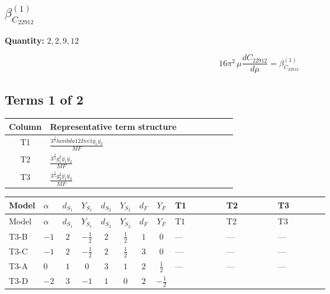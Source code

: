 \documentclass[8pt]{article}
\begin{document}
\begin{landscape}
\section*{$\beta_{C_{22912}}^{(1)}$}
\noindent\textbf{Quantity: }$\mathrm{2,2,9,12}$\par\smallskip
\[16\pi^2\,\mu\frac{d C_{22912}}{d\mu}=\beta_{C_{22912}}^{(1)}\]
\subsection*{Terms 1 of 2}
\begin{center}
\begin{tabular}{@{}c >{\raggedright\arraybackslash}p{0.82\linewidth}@{}}
\toprule
Column & Representative term structure \\
\midrule
T1 & \(\displaystyle \frac{3^{\frac{3}{4}} lambda12Inv1 \overline{y_{1}} \overline{y_{2}}}{MF}\) \\
\midrule
T2 & \(\displaystyle \frac{3^{\frac{3}{4}} g_{1}^{2} \overline{y_{1}} \overline{y_{2}}}{MF}\) \\
\midrule
T3 & \(\displaystyle \frac{3^{\frac{3}{4}} g_{2}^{2} \overline{y_{1}} \overline{y_{2}}}{MF}\) \\
\midrule
\bottomrule
\end{tabular}
\end{center}
\smallskip
\tiny
\begin{longtable}{@{}llcccccc >{\raggedright\arraybackslash}p{0.21\linewidth} >{\raggedright\arraybackslash}p{0.21\linewidth} >{\raggedright\arraybackslash}p{0.21\linewidth}@{}}
\toprule
Model & $\alpha$ & $d_{S_1}$ & $Y_{S_1}$ & $d_{S_2}$ & $Y_{S_2}$ & $d_F$ & $Y_F$ & T1 & T2 & T3 \\
\midrule
\endfirsthead
\toprule
Model & $\alpha$ & $d_{S_1}$ & $Y_{S_1}$ & $d_{S_2}$ & $Y_{S_2}$ & $d_F$ & $Y_F$ & T1 & T2 & T3 \\
\midrule
\endhead
T3-B & $-1$ & $2$ & $-\frac{1}{2}$ & $2$ & $\frac{1}{2}$ & $1$ & $0$ & --- & --- & --- \\
\midrule
T3-C & $-1$ & $2$ & $-\frac{1}{2}$ & $2$ & $\frac{1}{2}$ & $3$ & $0$ & --- & --- & --- \\
\midrule
T3-A & $0$ & $1$ & $0$ & $3$ & $1$ & $2$ & $\frac{1}{2}$ & --- & --- & --- \\
\midrule
T3-D & $-2$ & $3$ & $-1$ & $1$ & $0$ & $2$ & $-\frac{1}{2}$ & \scriptsize\adjustbox{max width=\linewidth}{$\begin{gathered} \frac{3^{\frac{3}{4}} lambda12Inv1 \overline{y_{1}} \overline{y_{2}}}{6 MF}\end{gathered}$} & \scriptsize\adjustbox{max width=\linewidth}{$\begin{gathered} \frac{3^{\frac{3}{4}} g_{1}^{2} \overline{y_{1}} \overline{y_{2}}}{8 MF}\end{gathered}$} & \scriptsize\adjustbox{max width=\linewidth}{$\begin{gathered} \frac{17 \cdot 3^{\frac{3}{4}} g_{2}^{2} \overline{y_{1}} \overline{y_{2}}}{24 MF}\end{gathered}$} \\

\end{longtable}
\end{landscape}
\end{document}
